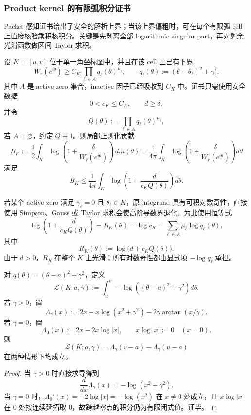 \subsubsection{Product kernel 的有限弧积分证书}\label{subsubsec:typed-address-biaxial-completion-finite-arc-quadrature-product-kernel-certificate}
Packet 感知证书给出了安全的解析上界；当该上界偏粗时，可在每个有限弧 cell 上直接核验乘积核积分。关键是先剥离全部 logarithmic singular part，再对剩余光滑函数做区间 Taylor 求积。

设 \(K=[u,v]\) 位于单一角坐标图中，并且在该 cell 上已有下界
\[
W_r(e^{i\theta})
\ge
C_K\prod_{\ell\in A}q_\ell(\theta)^{\mu_\ell},
\qquad
q_\ell(\theta):=(\theta-\theta_\ell)^2+\gamma_\ell^2.
\]
其中 \(A\) 是 active zero 集合，inactive 因子已经吸收到 \(C_K\) 中。证书只需使用安全数据
\[
0<c_K\le C_K,
\qquad
d\ge\delta,
\]
并令
\[
Q(\theta):=\prod_{\ell\in A}q_\ell(\theta)^{\mu_\ell},
\]
若 \(A=\varnothing\)，约定 \(Q\equiv1\)。则局部正则化贡献
\[
B_K
:=
\frac12\int_K
\log\left(1+\frac{\delta}{W_r(e^{i\theta})}\right)\,dm(\theta)
=
\frac1{4\pi}
\int_K
\log\left(1+\frac{\delta}{W_r(e^{i\theta})}\right)d\theta
\]
满足
\[
B_K
\le
\frac1{4\pi}
\int_K
\log\left(
1+\frac{d}{c_KQ(\theta)}
\right)d\theta.
\]

若某个 active zero 满足 \(\gamma_\ell=0\) 且 \(\theta_\ell\in K\)，原 integrand 具有可积对数奇性，直接使用 Simpson、Gauss 或 Taylor 求积会使高阶导数界退化。为此使用恒等式
\[
\log\left(
1+\frac{d}{c_KQ(\theta)}
\right)
=
R_K(\theta)-\log c_K-\sum_{\ell\in A}\mu_\ell\log q_\ell(\theta),
\]
其中
\[
R_K(\theta):=\log\bigl(d+c_KQ(\theta)\bigr).
\]
由于 \(d>0\)，\(R_K\) 在整个 \(K\) 上光滑；所有对数奇性都由显式项 \(-\log q_\ell\) 承担。

\begin{lemma}[单因子对数积分闭式]\label{lem:typed-address-biaxial-completion-single-log-factor-integral}
对 \(q(\theta)=(\theta-a)^2+\gamma^2\)，定义
\[
\mathcal L(K;a,\gamma)
:=
\int_u^v
-\log\left((\theta-a)^2+\gamma^2\right)d\theta.
\]
若 \(\gamma>0\)，置
\[
\Lambda_\gamma(x)
:=
2x-x\log(x^2+\gamma^2)-2\gamma\arctan(x/\gamma).
\]
若 \(\gamma=0\)，置
\[
\Lambda_0(x):=2x-2x\log|x|,
\qquad
x\log|x|:=0\quad(x=0).
\]
则
\[
\mathcal L(K;a,\gamma)
=
\Lambda_\gamma(v-a)-\Lambda_\gamma(u-a)
\]
在两种情形下均成立。
\end{lemma}
\begin{proof}
当 \(\gamma>0\) 时直接求导得到
\[
\frac{d}{dx}\Lambda_\gamma(x)
=
-\log(x^2+\gamma^2).
\]
当 \(\gamma=0\) 时，\(\Lambda_0'(x)=-2\log|x|=-\log(x^2)\) 在 \(x\ne0\) 处成立，且 \(x\log|x|\) 在 \(0\) 处按连续延拓取 \(0\)，故跨越零点的积分仍为有限闭式值。证毕。
\end{proof}

